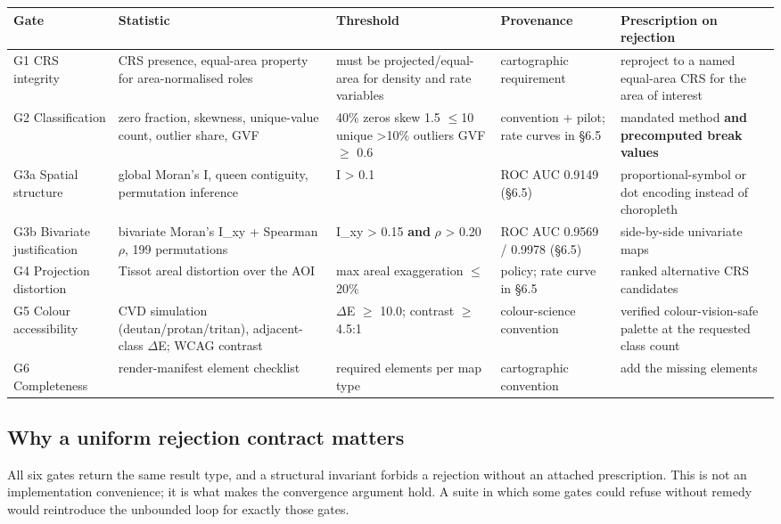 \begin{table}[htbp]
\centering
\footnotesize
\begin{tabular}{p{}p{}p{}p{}p{}}
\toprule
Gate & Statistic & Threshold & Provenance & Prescription on rejection \\
\midrule
G1 CRS integrity & CRS presence, equal-area property for area-normalised roles & must be projected/equal-area for density and rate variables & cartographic requirement & reproject to a named equal-area CRS for the area of interest \\
G2 Classification & zero fraction, skewness, unique-value count, outlier share, GVF & 40\% zeros \textperiodcentered{} \textbar{}skew\textbar{} 1.5 \textperiodcentered{} $\leq$10 unique \textperiodcentered{} >10\% outliers \textperiodcentered{} GVF $\geq$ 0.6 & convention + pilot; rate curves in \S{}6.5 & mandated method \textbf{and precomputed break values} \\
G3a Spatial structure & global Moran's I, queen contiguity, permutation inference & \textbar{}I\textbar{} > 0.1 & ROC AUC 0.9149 (\S{}6.5) & proportional-symbol or dot encoding instead of choropleth \\
G3b Bivariate justification & bivariate Moran's I\_xy + Spearman $\rho$, 199 permutations & \textbar{}I\_xy\textbar{} > 0.15 \textbf{and} \textbar{}$\rho$\textbar{} > 0.20 & ROC AUC 0.9569 / 0.9978 (\S{}6.5) & side-by-side univariate maps \\
G4 Projection distortion & Tissot areal distortion over the AOI & max areal exaggeration $\leq$ 20\% & policy; rate curve in \S{}6.5 & ranked alternative CRS candidates \\
G5 Colour accessibility & CVD simulation (deutan/protan/tritan), adjacent-class $\Delta$E; WCAG contrast & $\Delta$E $\geq$ 10.0; contrast $\geq$ 4.5:1 & colour-science convention & verified colour-vision-safe palette at the requested class count \\
G6 Completeness & render-manifest element checklist & required elements per map type & cartographic convention & add the missing elements \\
\bottomrule
\end{tabular}
\end{table}
\subsection{Why a uniform rejection contract matters}
All six gates return the same result type, and a structural invariant forbids a rejection without an attached prescription. This is not an implementation convenience; it is what makes the convergence argument hold. A suite in which some gates could refuse without remedy would reintroduce the unbounded loop for exactly those gates.

